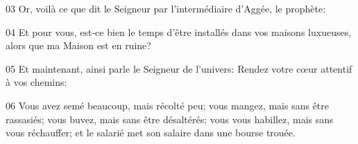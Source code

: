 
03 Or, voilà ce que dit le Seigneur par l’intermédiaire d’Aggée, le prophète:

04 Et pour vous, est-ce bien le temps d’être installés dans vos maisons luxueuses, alors que ma Maison est en ruine?

05 Et maintenant, ainsi parle le Seigneur de l’univers: Rendez votre cœur attentif à vos chemins:

06 Vous avez semé beaucoup, mais récolté peu; vous mangez, mais sans être rassasiés; vous buvez, mais sans être désaltérés; vous vous habillez, mais sans vous réchauffer; et le salarié met son salaire dans une bourse trouée.
